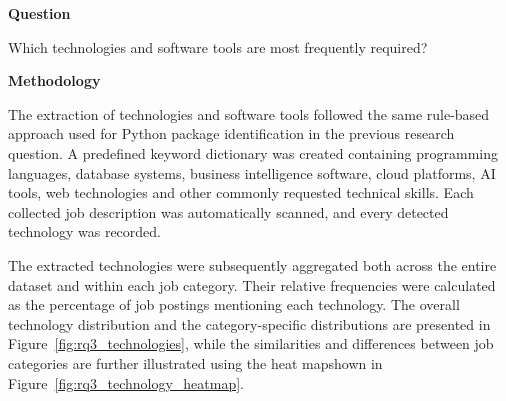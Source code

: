 \textbf{Question}

Which technologies and software tools are most frequently required?

\medskip

\textbf{Methodology}

The extraction of technologies and software tools followed the same rule-based approach used for Python package identification in the previous
research question. A predefined keyword dictionary was created containing  programming languages, database systems, business intelligence software,
cloud platforms, AI tools, web technologies and other commonly requested technical skills. Each collected job description was automatically scanned,
and every detected technology was recorded.

The extracted technologies were subsequently aggregated both across the entire dataset and within each job category. Their relative frequencies were
calculated as the percentage of job postings mentioning each technology. The overall technology distribution and the category-specific distributions
are presented in Figure~\ref{fig:rq3_technologies}, while the similarities and differences between job categories are further illustrated using
the heat mapshown in Figure~\ref{fig:rq3_technology_heatmap}.

